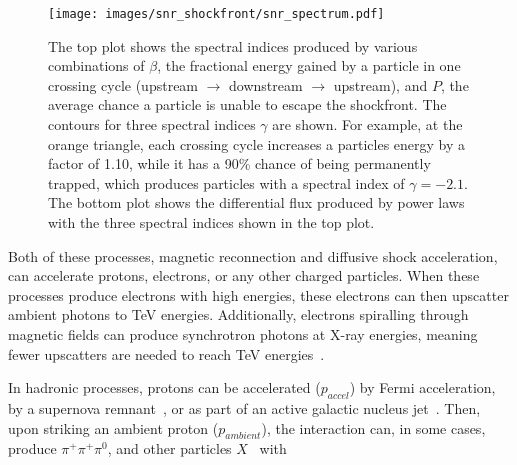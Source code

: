   \begin{figure}[!p]
    \centering
    \texttt{[image: images/snr\_shockfront/snr\_spectrum.pdf]}
    \caption[Supernova Diffuse Acceleration Spectral Indices]{
      The top plot shows the spectral indices produced by various combinations of $\beta$, the fractional energy gained by a particle in one crossing cycle (upstream $\rightarrow$ downstream $\rightarrow$ upstream), and $P$, the average chance a particle is unable to escape the shockfront.
      The contours for three spectral indices $\gamma$ are shown.
      For example, at the orange triangle, each crossing cycle increases a particles energy by a factor of 1.10, while it has a 90\% chance of being permanently trapped, which produces particles with a spectral index of $\gamma=-2.1$.
      The bottom plot shows the differential flux produced by power laws with the three spectral indices shown in the top plot.
    }\label{fig:snr_spectrum}
  \end{figure}
  
  \FloatBarrier
  
  
  


  
  Both of these processes, magnetic reconnection and diffusive shock acceleration, can accelerate protons, electrons, or any other charged particles.
  When these processes produce electrons with high energies, these electrons can then upscatter ambient photons to TeV energies.
  Additionally, electrons spiralling through magnetic fields can produce synchrotron photons at X-ray energies, meaning fewer upscatters are needed to reach TeV energies~\cite{self_compton}.

  In hadronic processes, protons can be accelerated ($p_{accel}$) by Fermi acceleration, by a supernova remnant~\cite{proton_snr_accel}, or as part of an active galactic nucleus jet~\cite{hadronic1,hadronic2}.
  Then, upon striking an ambient proton ($p_{ambient}$), the interaction can, in some cases, produce $\pi^{+}\pi^{+}\pi^{0}$, and other particles $X$~\cite{pp_pion,pp_pion2,pp_pion3} with
  
